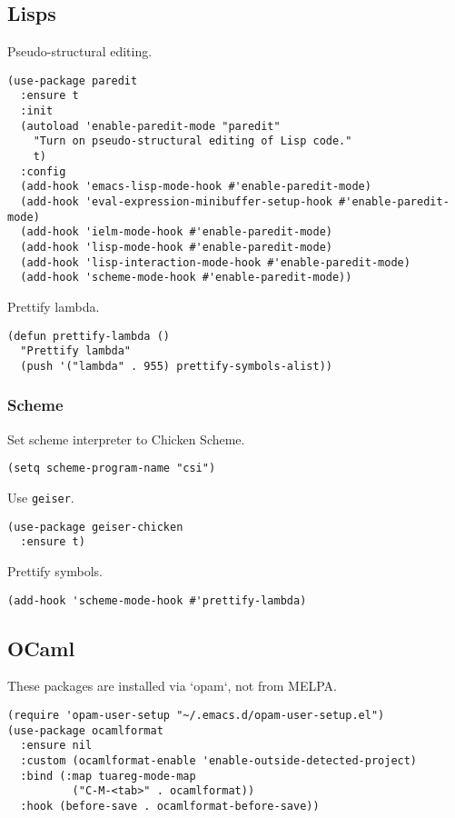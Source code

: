 \documentclass[a4paper,11pt]{article}
\begin{document}
\subsection{Lisps}
\label{sec:orgabb9916}
Pseudo-structural editing.
\begin{verbatim}
(use-package paredit
  :ensure t
  :init
  (autoload 'enable-paredit-mode "paredit"
    "Turn on pseudo-structural editing of Lisp code."
    t)
  :config
  (add-hook 'emacs-lisp-mode-hook #'enable-paredit-mode)
  (add-hook 'eval-expression-minibuffer-setup-hook #'enable-paredit-mode)
  (add-hook 'ielm-mode-hook #'enable-paredit-mode)
  (add-hook 'lisp-mode-hook #'enable-paredit-mode)
  (add-hook 'lisp-interaction-mode-hook #'enable-paredit-mode)
  (add-hook 'scheme-mode-hook #'enable-paredit-mode))
\end{verbatim}

Prettify lambda.
\begin{verbatim}
(defun prettify-lambda ()
  "Prettify lambda"
  (push '("lambda" . 955) prettify-symbols-alist))
\end{verbatim}

\subsubsection{Scheme}
\label{sec:orgf9c750e}
Set scheme interpreter to Chicken Scheme.
\begin{verbatim}
(setq scheme-program-name "csi")
\end{verbatim}

Use \texttt{geiser}.
\begin{verbatim}
(use-package geiser-chicken
  :ensure t)
\end{verbatim}

Prettify symbols.
\begin{verbatim}
(add-hook 'scheme-mode-hook #'prettify-lambda)
\end{verbatim}

\subsection{OCaml}
\label{sec:orgf87047b}
These packages are installed via `opam`, not from MELPA.
\begin{verbatim}
(require 'opam-user-setup "~/.emacs.d/opam-user-setup.el")
(use-package ocamlformat
  :ensure nil
  :custom (ocamlformat-enable 'enable-outside-detected-project)
  :bind (:map tuareg-mode-map
	      ("C-M-<tab>" . ocamlformat))
  :hook (before-save . ocamlformat-before-save))
\end{verbatim}
\end{document}
